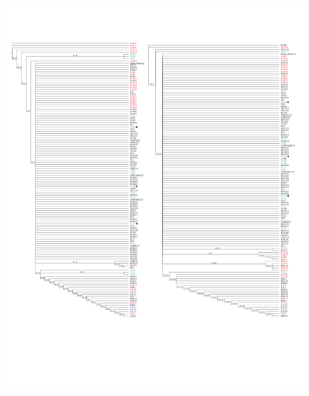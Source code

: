 \documentclass[11pt]{article}
\begin{document}
\begin{linenumbers}
\begin{flushleft}
\begin{figure}[!t]
  \begin{center}
   \includegraphics[width=150mm]{FigS3NJtrees.pdf}
\label{FigS3NJ}
  \end{center}
\end{figure}


\end{flushleft}
\end{linenumbers}
\end{document}
